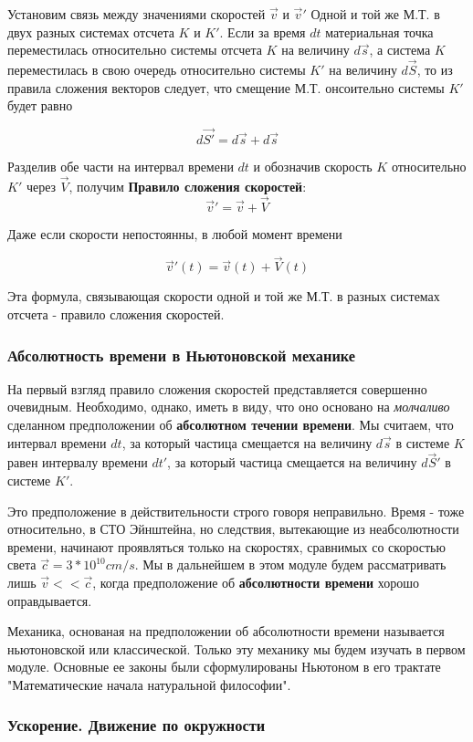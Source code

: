 \documentclass{article}
\begin{document}
Установим связь между значениями скоростей $\vec{v}$ и $\vec{v}'$ Одной и той же М.Т. в двух разных системах отсчета $K$ и $K'$. Если за время $dt$ материальная точка переместилась относительно системы отсчета $K$ на величину $d\vec{s}$, а система $K$ переместилась в свою очередь относительно системы $K'$ на величину $d\vec{S}$, то из правила сложения векторов следует, что смещение М.Т. онсоительно системы $K'$ будет равно 

$$d\vec{S'} = d\vec{s} + d\vec{s}$$ 

Разделив обе части на интервал времени $dt$ и обозначив скорость $K$ относительно $K'$ через $\vec{V}$, получим \textbf{Правило сложения скоростей}:
$$\vec{v}' = \vec{v} + \vec{V}$$

Даже если скорости непостоянны, в любой момент времени

$$\vec{v}'(t) = \vec{v}(t) + \vec{V}(t)$$

Эта формула, связывающая скорости одной и той же М.Т. в разных системах отсчета - правило сложения скоростей.

\subsubsection{Абсолютность времени в Ньютоновской механике}

На первый взгляд правило сложения скоростей представляется совершенно очевидным. Необходимо, однако, иметь в виду, что оно основано на \emph{молчаливо} сделанном предположении об \textbf{абсолютном течении времени}. Мы считаем, что интервал времени $dt$, за который частица смещается на величину $d\vec{s}$ в системе $K$ равен интервалу времени $dt'$, за который частица смещается на величину $d\vec{S}'$ в системе $K'$.

Это предположение в действительности строго говоря неправильно. Время - тоже относительно, в СТО Эйнштейна, но следствия, вытекающие из неабсолютности времени, начинают проявляться только на скоростях, сравнимых со скоростью света $\vec{c} = 3*10^{10} cm/s$. Мы в дальнейшем в этом модуле будем рассматривать лишь 	$\vec{v}<<\vec{c}$, когда предположение об \textbf{абсолютности времени} хорошо оправдывается. 

Механика, основаная на предположении об абсолютности времени называется ньютоновской или классической. Только эту механику мы будем изучать в первом модуле. Основные ее законы были сформулированы Ньютоном в его трактате "Математические начала натуральной философии".

\subsubsection{Ускорение. Движение по окружности}
\end{document}
